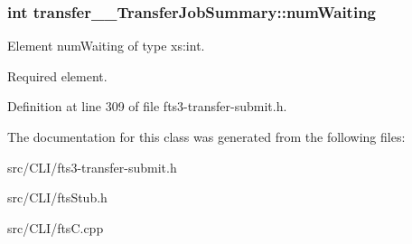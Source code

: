\subsubsection[{numWaiting}]{\setlength{\rightskip}{0pt plus 5cm}int {\bf transfer\_\-\_\-TransferJobSummary::numWaiting}}\label{classtransfer____TransferJobSummary_a62914dc47eb7c28cb2e5c2745a02e1c7}


Element numWaiting of type xs:int. 

Required element. 

Definition at line 309 of file fts3-\/transfer-\/submit.h.



The documentation for this class was generated from the following files:\begin{DoxyCompactItemize}
\item 
src/CLI/fts3-\/transfer-\/submit.h\item 
src/CLI/ftsStub.h\item 
src/CLI/ftsC.cpp\end{DoxyCompactItemize}
